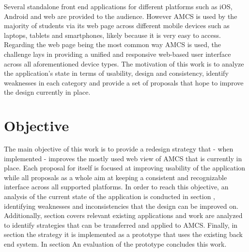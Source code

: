\newline
\newline
Several standalone front end applications for different platforms such as iOS, Android and web are provided to the audience. However AMCS is used by the majority of students via its web page across different mobile devices such as laptops, tablets and smartphones, likely because it is very easy to access.
\newline
\newline 
Regarding the web page being the most common way AMCS is used, 
the challenge lays in providing a unified and responsive web-based user interface across all aforementioned device types. The motivation of this work is to analyze the application's state in terms of usability, design and consistency, identify weaknesses in each category and provide a set of proposals that hope to improve the design currently in place.

\section{Objective}

The main objective of this work is to provide a redesign strategy that - when implemented - improves the mostly used web view of AMCS that is currently in place.
Each proposal for itself is focused at improving usability of the application while all proposals as a whole aim at keeping a consistent and recognizable interface across all supported platforms. 
\newline
\newline
In order to reach this objective, an analysis of the current state of the application is conducted in section \todosct, identifying weaknesses and inconsistencies that the design can be improved on.
\newline
\newline
Additionally, section \todosct covers relevant existing applications and work are analyzed to identify strategies that can be transferred and applied to AMCS. 
\newline
\newline
Finally, in section \todosct the strategy it is implemented as a prototype that uses the existing back end system. In section \todosct An evaluation of the prototype concludes this work.